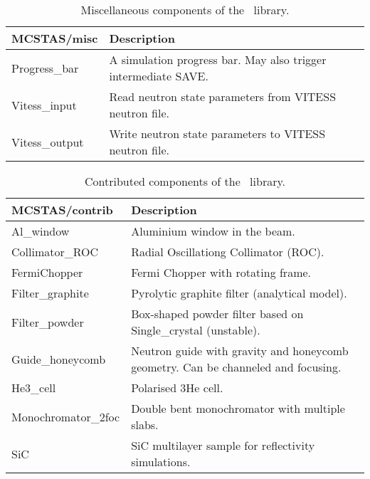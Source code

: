 \begin{table}
  \begin{center}
    {\let\my=\\
    \begin{tabular}{|p{}|p{}|}
      \hline
       MCSTAS/misc & Description \\ 
       \hline
       Progress\_bar  &       A simulation
                      progress bar. May also trigger intermediate SAVE.\\ 
 Vitess\_input      &   Read neutron state
                      parameters from
                      VITESS neutron file.\\ 
 Vitess\_output    &  Write neutron state
     parameters to VITESS
                      neutron file.\\
      \hline
    \end{tabular}
    \caption{Miscellaneous components of the \MCS\ library.}
    \label{t:comp-misc}
    }
  \end{center}
\end{table}

\begin{table}
  \begin{center}
    {\let\my=\\
    \begin{tabular}{|p{}|p{}|}
      \hline
       MCSTAS/contrib & Description \\ 
       \hline
       Al\_window     &         Aluminium
                        window in the beam. \\
 Collimator\_ROC   &      Radial
                        Oscillationg
                        Collimator (ROC). \\
 FermiChopper    &       Fermi Chopper with
                        rotating frame. \\
 Filter\_graphite  &      Pyrolytic
                        graphite filter
                        (analytical model). \\
 Filter\_powder   &       Box-shaped powder
                        filter based on Single\_crystal (unstable). \\
 Guide\_honeycomb & Neutron guide
                        with gravity and
                        honeycomb geometry. Can be
                        channeled and
                        focusing. \\
 He3\_cell    &           Polarised 3He cell. \\

 Monochromator\_2foc   &  Double bent
                        monochromator with
                        multiple slabs. \\

 SiC           &         SiC multilayer sample for reflectivity simulations. \\
      \hline
    \end{tabular}
    \caption{Contributed components of the \MCS\ library.}
    \label{t:comp-contrib}
    }
  \end{center}
\end{table}

